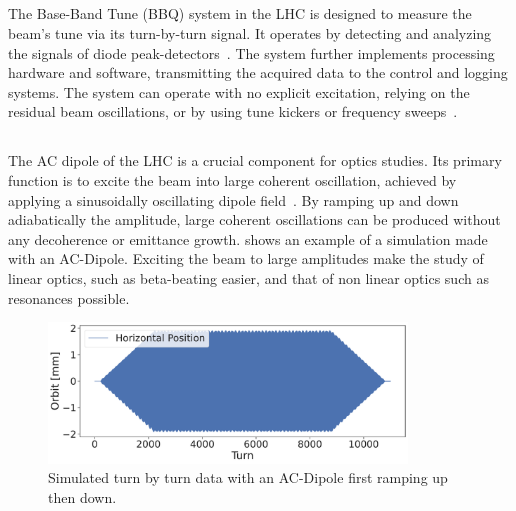 \subsection{}

The Base-Band Tune (BBQ) system in the LHC is designed to measure the beam's tune via its
turn-by-turn signal. It operates by detecting and analyzing the signals of diode
peak-detectors~\cite{boccardi_first_2009,gasior_high_2005}. The system further implements processing
hardware and software, transmitting the acquired data to the control and logging systems.  The
system can operate with no explicit excitation, relying on the residual beam oscillations, or by
using tune kickers or frequency sweeps~\cite{boccardi_first_2009}.


\subsection{}

The AC dipole of the LHC is a crucial component for optics studies. Its primary function is to
excite the beam into large coherent oscillation, achieved by applying a sinusoidally oscillating
dipole field~\cite{miyamoto_parametrization_2008}. By ramping up and down adiabatically the
amplitude, large coherent oscillations can be produced without any decoherence or emittance growth.
 shows an example of a simulation made with an AC-Dipole. Exciting the beam to
large amplitudes make the study of linear optics, such as beta-beating easier, and that of non
linear optics such as resonances possible.

\begin{figure}
    \center
    \includegraphics[width=0.85\textwidth]{./images/ac_dipole_tbt.pdf}
    \caption{Simulated turn by turn data with an AC-Dipole first ramping up then down.} 
    \label{fig:ac_dipole}
\end{figure}

